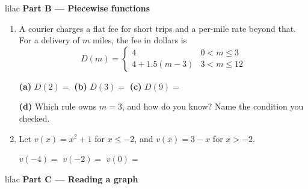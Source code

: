 \documentclass[10pt]{article}
\begin{document}
\vspace{0.14in}

\begin{headlinebox}{lilac}
\textbf{\color{plum}Part B --- Piecewise functions}
\end{headlinebox}

\begin{enumerate}[leftmargin=1.9em, itemsep=9pt, start=4]

\item A courier charges a flat fee for short trips and a per-mile rate beyond that. For a
      delivery of $m$ miles, the fee in dollars is
      \[ D(m) = \begin{cases} 4 & 0 < m \le 3 \\[2pt] 4 + 1.5(m - 3) & 3 < m \le 12 \end{cases} \]

      \textbf{(a)} $D(2) = $ \blank{2.0cm} \hfill
      \textbf{(b)} $D(3) = $ \blank{2.0cm} \hfill
      \textbf{(c)} $D(9) = $ \blank{2.0cm}

      \textbf{(d)} Which rule owns $m = 3$, and how do you know? Name the condition you checked.
      \writespace{1.2cm}{}

\item Let $v(x) = x^2 + 1$ for $x \le -2$, and $v(x) = 3 - x$ for $x > -2$.

      $v(-4) = $ \blank{1.8cm} \qquad $v(-2) = $ \blank{1.8cm} \qquad $v(0) = $ \blank{1.8cm}

\end{enumerate}

\newpage

\begin{headlinebox}{lilac}
\textbf{\color{plum}Part C --- Reading a graph}
\end{headlinebox}
\end{document}
